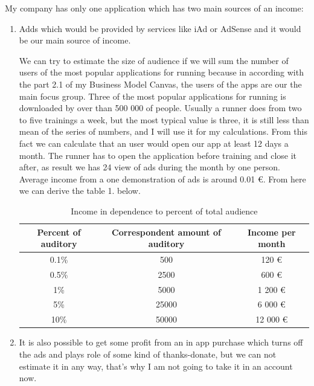\documentclass[english]{article}
\begin{document}
My company has only one application which has two main sources of an income:
\begin{enumerate}

  \item Adds which would be provided by services like iAd or AdSense and it would be our main source of income.

We can try to estimate the size of audience if we will sum the number of users of the most popular applications for running because in according with the part 2.1 of my Business Model Canvas, the users of the apps are our the main focus group.
Three of the most popular applications for running is downloaded by over than 500 000 of people. Usually a runner does from two to five trainings a week, but the most typical value is three, it is still less than mean of the series of numbers, and I will use it for my calculations. From this fact we can calculate that an user would open our app at least 12 days a month. The runner has to open the application before training and close it after, as result we has 24 view of ads during the month by one person. Average income from a one demonstration of ads is around 0.01 \euro . From here we can derive the table 1. below.	

\begin{table}[H]
 \begin{center}
  \caption{Income in dependence to percent of total audience }
    \begin{tabular}{ c c c }    
    	\hline
  	  Percent of auditory & Correspondent amount of auditory & Income per month  \\ \hline
  	   0.1\% & 500 & 120 \euro \\  
  	   0.5\% & 2500 & 600 \euro \\  
		1\% & 5000 & 1 200 \euro \\    
 	   5\% & 25000 & 6 000 \euro \\
 	   10\% & 50000 & 12 000 \euro \\
  	  \hline
    \end{tabular}
 \end{center}
\end{table}

  \item It is also possible to get some profit from an in app purchase which turns off the ads and plays role of some kind of thanks-donate, but we can not estimate it in any way, that's why I am not going to take it in an account now. 

\end{enumerate}
\end{document}

